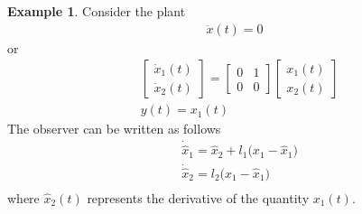 \documentclass[11pt,a4paper,oneside]{book}
\numberwithin{equation}{section}
\theoremstyle{it}
\theoremstyle{definition}
\newtheorem{example}{Example}[chapter]
\begin{document}
\begin{example}
	Consider the plant 
	\begin{equation}
		\begin{aligned}
			\ddot{x}(t)=0
		\end{aligned}
	\end{equation}
	or
	\begin{equation}
		\begin{aligned}
			&\begin{bmatrix} \dot{x}_1(t) \\[6pt] \dot{x}_2(t) \end{bmatrix} = \begin{bmatrix} 0&1 \\[6pt] 0&0 \end{bmatrix}\begin{bmatrix} {x}_1(t) \\[6pt] {x}_2(t) \end{bmatrix}\\[6pt]
			&y(t) = x_1(t)
		\end{aligned}
	\end{equation}
	The observer can be written as follows
	\begin{equation}
		\begin{aligned}
			&\dot{\hat{x}}_1 = {\hat{x}}_2 + l_1\big(x_1-\hat{x}_1\big)\\[6pt]
			&\dot{\hat{x}}_2 = l_2\big(x_1-\hat{x}_1\big)\\[6pt]
		\end{aligned}
	\end{equation}
	where $\hat{x}_2(t)$ represents the derivative of the quantity ${x}_1(t)$.
	

\end{example}
\end{document}
